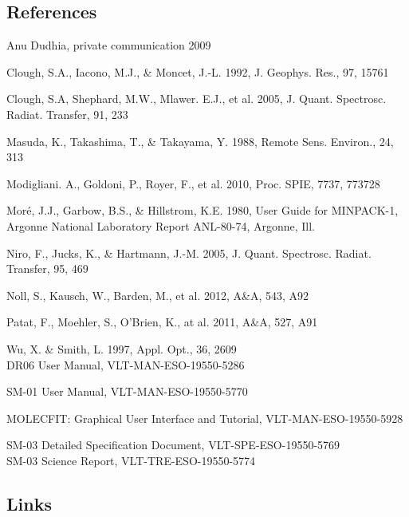 \documentclass[a4paper,twoside,11pt]{article}
\begin{document}
\begin{thebibliography}{99}

\section*{{\hspace{-\leftmargin}}References}

Anu Dudhia, private communication 2009

Clough, S.A., Iacono,  M.J., \& Moncet, J.-L. 1992, J. Geophys. Res., 97, 15761

Clough, S.A, Shephard, M.W., Mlawer. E.J., et al. 2005, J. Quant. Spectrosc.
Radiat. Transfer, 91, 233

Masuda, K., Takashima, T., \& Takayama, Y. 1988, Remote Sens. Environ., 24, 313

Modigliani. A., Goldoni, P., Royer, F., et al. 2010, Proc. SPIE, 7737, 773728

Mor\'e, J.J., Garbow, B.S., \& Hillstrom, K.E. 1980, User Guide for MINPACK-1,
Argonne National Laboratory Report ANL-80-74, Argonne, Ill.

Niro, F., Jucks, K., \& Hartmann, J.-M. 2005, J. Quant. Spectrosc. Radiat.
Transfer, 95, 469

Noll, S., Kausch, W., Barden, M., et al. 2012, A\&A, 543, A92

Patat, F., Moehler, S., O'Brien, K., at al. 2011, A\&A, 527, A91

Wu, X. \& Smith, L. 1997, Appl. Opt., 36, 2609 \\[0.5cm]

DR06 User Manual, VLT-MAN-ESO-19550-5286

SM-01 User Manual, VLT-MAN-ESO-19550-5770

MOLECFIT: Graphical User Interface and Tutorial, VLT-MAN-ESO-19550-5928

SM-03 Detailed Specification Document, VLT-SPE-ESO-19550-5769 \\[0.5cm]

SM-03 Science Report, VLT-TRE-ESO-19550-5774 \\[0.5cm]

\subsection*{{\hspace{-\leftmargin}}Links}


\end{thebibliography}
\end{document}
